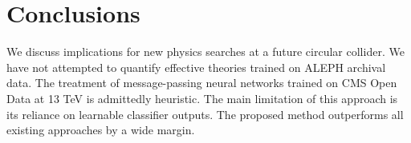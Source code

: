 \section{Conclusions}\label{sec:conclusions}

We discuss implications for new physics searches at a future circular
collider. We have not attempted to quantify effective theories trained
on ALEPH archival data. The treatment of message-passing neural networks
trained on CMS Open Data at 13 TeV is admittedly heuristic. The main
limitation of this approach is its reliance on learnable classifier
outputs. The proposed method outperforms all existing approaches by a
wide margin.

